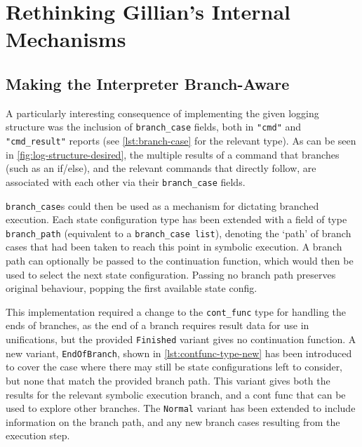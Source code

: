 
\section{Rethinking Gillian's Internal Mechanisms}

\subsection{Making the Interpreter Branch-Aware}%
\label{sec:interpreter-branching}

A particularly interesting consequence of implementing the given logging
structure was the inclusion of \texttt{branch\_case} fields, both in
\texttt{"cmd"} and \texttt{"cmd\_result"} reports (see \autoref{lst:branch-case}
for the relevant type). As can be seen in \autoref{fig:log-structure-desired},
the multiple results of a command that branches (such as an if/else), and the
relevant commands that directly follow, are associated with each other via their
\texttt{branch\_case} fields.

\texttt{branch\_case}s could then be used as a mechanism for dictating branched
execution. Each state configuration type has been extended with a field of type
\texttt{branch\_path} (equivalent to a \texttt{branch\_case list}),  denoting
the `path' of branch cases that had been taken to reach this point in symbolic
execution. A branch path can optionally be passed to the continuation function,
which would then be used to select the next state configuration. Passing no
branch path preserves original behaviour, popping the first available state
config.

This implementation required a change to the \texttt{cont\_func} type for
handling the ends of branches, as the end of a branch requires result data for
use in unifications, but the provided \texttt{Finished} variant gives no
continuation function. A new variant, \texttt{EndOfBranch}, shown in
\autoref{lst:contfunc-type-new} has been introduced to cover the case where
there may still be state configurations left to consider, but none that match
the provided branch path. This variant gives both the results for the relevant
symbolic execution branch, and a cont func that can be used to explore other
branches. The \texttt{Normal} variant has been extended to include information
on the branch path, and any new branch cases resulting from the execution step.

